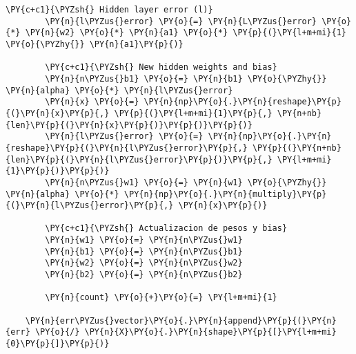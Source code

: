 \begin{tcolorbox}[breakable, size=fbox, boxrule=1pt, pad at break*=1mm,colback=cellbackground, colframe=cellborder]
\begin{Verbatim}[commandchars=\\\{\}]
        \PY{c+c1}{\PYZsh{} Hidden layer error (l)}
        \PY{n}{l\PYZus{}error} \PY{o}{=} \PY{n}{L\PYZus{}error} \PY{o}{*} \PY{n}{w2} \PY{o}{*} \PY{n}{a1} \PY{o}{*} \PY{p}{(}\PY{l+m+mi}{1} \PY{o}{\PYZhy{}} \PY{n}{a1}\PY{p}{)}
        
        \PY{c+c1}{\PYZsh{} New hidden weights and bias}
        \PY{n}{n\PYZus{}b1} \PY{o}{=} \PY{n}{b1} \PY{o}{\PYZhy{}} \PY{n}{alpha} \PY{o}{*} \PY{n}{l\PYZus{}error}
        \PY{n}{x} \PY{o}{=} \PY{n}{np}\PY{o}{.}\PY{n}{reshape}\PY{p}{(}\PY{n}{x}\PY{p}{,} \PY{p}{(}\PY{l+m+mi}{1}\PY{p}{,} \PY{n+nb}{len}\PY{p}{(}\PY{n}{x}\PY{p}{)}\PY{p}{)}\PY{p}{)}
        \PY{n}{l\PYZus{}error} \PY{o}{=} \PY{n}{np}\PY{o}{.}\PY{n}{reshape}\PY{p}{(}\PY{n}{l\PYZus{}error}\PY{p}{,} \PY{p}{(}\PY{n+nb}{len}\PY{p}{(}\PY{n}{l\PYZus{}error}\PY{p}{)}\PY{p}{,} \PY{l+m+mi}{1}\PY{p}{)}\PY{p}{)}
        \PY{n}{n\PYZus{}w1} \PY{o}{=} \PY{n}{w1} \PY{o}{\PYZhy{}} \PY{n}{alpha} \PY{o}{*} \PY{n}{np}\PY{o}{.}\PY{n}{multiply}\PY{p}{(}\PY{n}{l\PYZus{}error}\PY{p}{,} \PY{n}{x}\PY{p}{)}
        
        \PY{c+c1}{\PYZsh{} Actualizacion de pesos y bias}
        \PY{n}{w1} \PY{o}{=} \PY{n}{n\PYZus{}w1}
        \PY{n}{b1} \PY{o}{=} \PY{n}{n\PYZus{}b1}
        \PY{n}{w2} \PY{o}{=} \PY{n}{n\PYZus{}w2}
        \PY{n}{b2} \PY{o}{=} \PY{n}{n\PYZus{}b2}
        
        \PY{n}{count} \PY{o}{+}\PY{o}{=} \PY{l+m+mi}{1}
        
    \PY{n}{err\PYZus{}vector}\PY{o}{.}\PY{n}{append}\PY{p}{(}\PY{n}{err} \PY{o}{/} \PY{n}{X}\PY{o}{.}\PY{n}{shape}\PY{p}{[}\PY{l+m+mi}{0}\PY{p}{]}\PY{p}{)}
    
\end{Verbatim}
\end{tcolorbox}

